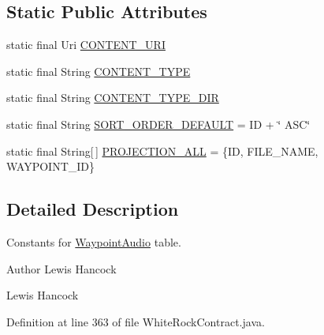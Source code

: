\subsection*{Static Public Attributes}
\begin{DoxyCompactItemize}
\item 
static final Uri \hyperlink{classuk_1_1ac_1_1swan_1_1digitaltrails_1_1database_1_1_white_rock_contract_1_1_waypoint_audio_a85a63a0660e04f533250325507776c89}{C\+O\+N\+T\+E\+N\+T\+\_\+\+U\+R\+I}
\item 
static final String \hyperlink{classuk_1_1ac_1_1swan_1_1digitaltrails_1_1database_1_1_white_rock_contract_1_1_waypoint_audio_ac3e337a4c430e4fd3e978f695e466d70}{C\+O\+N\+T\+E\+N\+T\+\_\+\+T\+Y\+P\+E}
\item 
static final String \hyperlink{classuk_1_1ac_1_1swan_1_1digitaltrails_1_1database_1_1_white_rock_contract_1_1_waypoint_audio_a36f6175ca88469a5536b138d9c3b8bae}{C\+O\+N\+T\+E\+N\+T\+\_\+\+T\+Y\+P\+E\+\_\+\+D\+I\+R}
\item 
static final String \hyperlink{classuk_1_1ac_1_1swan_1_1digitaltrails_1_1database_1_1_white_rock_contract_1_1_waypoint_audio_a30370143517411399e60c1421e748229}{S\+O\+R\+T\+\_\+\+O\+R\+D\+E\+R\+\_\+\+D\+E\+F\+A\+U\+L\+T} = I\+D + \char`\"{} A\+S\+C\char`\"{}
\item 
static final String\mbox{[}$\,$\mbox{]} \hyperlink{classuk_1_1ac_1_1swan_1_1digitaltrails_1_1database_1_1_white_rock_contract_1_1_waypoint_audio_ac48aee65ee219c81dc9f422a4df4cb29}{P\+R\+O\+J\+E\+C\+T\+I\+O\+N\+\_\+\+A\+L\+L} = \{I\+D, F\+I\+L\+E\+\_\+\+N\+A\+M\+E, W\+A\+Y\+P\+O\+I\+N\+T\+\_\+\+I\+D\}
\end{DoxyCompactItemize}


\subsection{Detailed Description}
Constants for \hyperlink{classuk_1_1ac_1_1swan_1_1digitaltrails_1_1database_1_1_white_rock_contract_1_1_waypoint_audio}{Waypoint\+Audio} table. 

\begin{DoxyAuthor}{Author}
Lewis Hancock 

Lewis Hancock 
\end{DoxyAuthor}


Definition at line 363 of file White\+Rock\+Contract.\+java.



